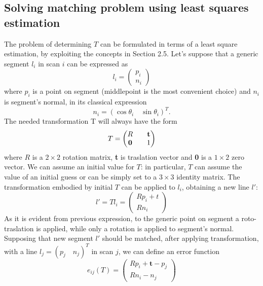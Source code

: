 \documentclass[a4paper, onecolumn]{report}
\begin{document}
\subsection{Solving matching problem using least squares estimation}
The problem of determining $T$ can be formulated in terms of a least square estimation, by exploiting the concepts in Section 2.5. Let's suppose that a generic segment $l_i$ in scan $i$ can be expressed as 
\begin{equation}
	l_i = \left(\begin{matrix} p_i \\ n_i \end{matrix} \right)
\end{equation}
where $p_i$ is a point on segment (middlepoint is the most convenient choice) and $n_i$ is segment's normal, in its classical expression
\begin{equation}
	n_i = (\cos\theta_i \quad \sin\theta_i)^T.
\end{equation}
The needed transformation T will always have the form
\begin{equation}
	T = \left(\begin{matrix} R && \bf{t} \\ \bf{0} && 1 \end{matrix}\right)
\end{equation}
where $R$ is a $2\times2$ rotation matrix, \textbf{t} is traslation vector and \textbf{0} is a $1\times2$ zero vector. We can assume an initial value for $T$: in particular, $T$ can assume the value of an initial guess or can be simply set to a $3\times3$ identity matrix. The transformation embodied by initial $T$ can be applied to $l_i$, obtaining a new line $l'$:
\begin{equation}
	l' = Tl_i = \left(\begin{matrix}Rp_i+t \\ Rn_i\end{matrix}\right)
\end{equation}
As it is evident from previous expression, to the generic point on segment a roto-traslation is applied, while only a rotation is applied to segment's normal. Supposing that new segment $l'$ should be matched, after applying transformation, with a line $l_j = (p_j \quad n_j)^T$ in scan $j$, we can define an error function
\begin{equation}
	e_{ij}(T) = \left(\begin{matrix}Rp_i + \textbf{t} - p_j \\ Rn_i - n_j \end{matrix}\right)
\end{equation}
\end{document}
